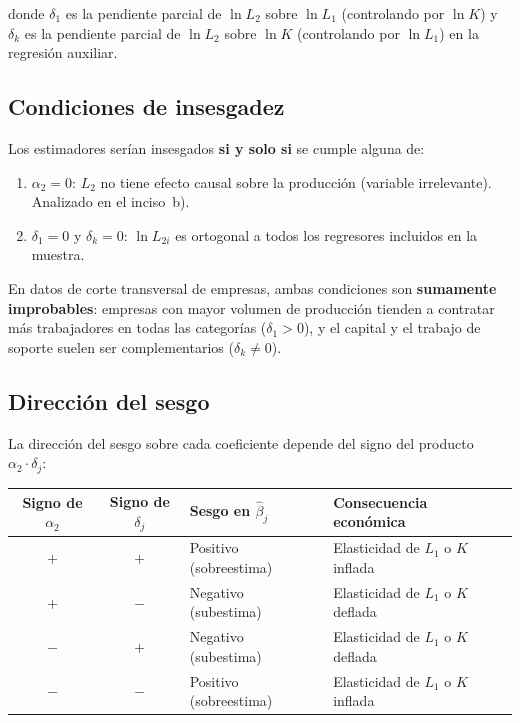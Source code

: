 \documentclass[12pt, letterpaper]{article}
\begin{document}
donde $\delta_1$ es la pendiente parcial de $\ln L_2$ sobre $\ln L_1$
(controlando por $\ln K$) y $\delta_k$ es la pendiente parcial de $\ln L_2$
sobre $\ln K$ (controlando por $\ln L_1$) en la regresión auxiliar.

\subsection{Condiciones de insesgadez}

Los estimadores serían insesgados \textbf{si y solo si} se cumple alguna de:

\begin{enumerate}[leftmargin=1.8em]
  \item $\alpha_2 = 0$: $L_2$ no tiene efecto causal sobre la producción
    (variable irrelevante). Analizado en el inciso~b).
  \item $\delta_1 = 0$ y $\delta_k = 0$: $\ln L_{2i}$ es ortogonal a todos
    los regresores incluidos en la muestra.
\end{enumerate}

En datos de corte transversal de empresas, ambas condiciones son
\textbf{sumamente improbables}: empresas con mayor volumen de producción
tienden a contratar más trabajadores en todas las categorías ($\delta_1 > 0$),
y el capital y el trabajo de soporte suelen ser complementarios
($\delta_k \neq 0$).

\subsection{Dirección del sesgo}

La dirección del sesgo sobre cada coeficiente depende del signo del
producto $\alpha_2 \cdot \delta_j$:

\begin{center}
\renewcommand{\arraystretch}{1.3}
\small
\begin{tabular}{ccp{3.6cm}p{5.0cm}}
\toprule
\textbf{Signo de $\alpha_2$} & \textbf{Signo de $\delta_j$} &
\textbf{Sesgo en $\hat{\beta}_j$} & \textbf{Consecuencia económica} \\
\midrule
$+$ & $+$ & Positivo (sobreestima) & Elasticidad de $L_1$ o $K$ inflada \\
$+$ & $-$ & Negativo (subestima)   & Elasticidad de $L_1$ o $K$ deflada \\
$-$ & $+$ & Negativo (subestima)   & Elasticidad de $L_1$ o $K$ deflada \\
$-$ & $-$ & Positivo (sobreestima) & Elasticidad de $L_1$ o $K$ inflada \\
\bottomrule
\end{tabular}
\end{center}
\end{document}
